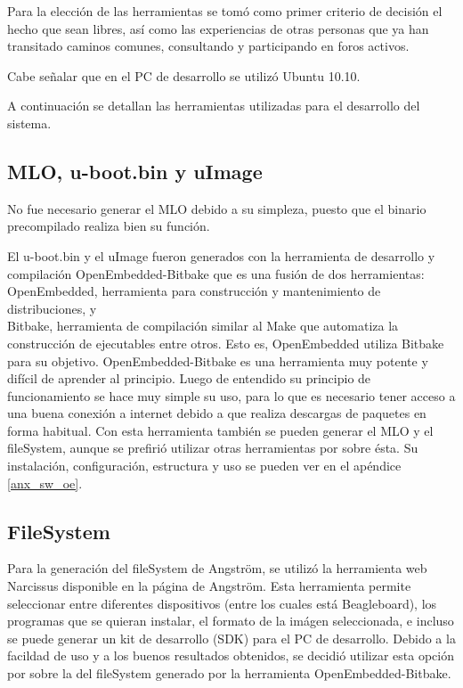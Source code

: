Para la elección de las herramientas se tomó como primer criterio de decisión el hecho que sean libres, así como las experiencias de otras personas que ya han transitado caminos comunes, consultando y participando en foros activos.

\bigskip
Cabe señalar que en el PC de desarrollo se utilizó Ubuntu 10.10.

\bigskip
A continuación se detallan las herramientas utilizadas para el desarrollo del sistema. 

\subsection{MLO, u-boot.bin y uImage}
No fue necesario generar el MLO debido a su simpleza, puesto que el binario precompilado realiza bien su función.

El u-boot.bin y el uImage fueron generados con la herramienta de desarrollo y compilación OpenEmbedded-Bitbake \cite{OE-Bb} que es una fusión de dos herramientas: OpenEmbedded, herramienta para construcción y mantenimiento de distribuciones, y \\
Bitbake, herramienta de compilación similar al Make \cite{Make} que automatiza la construcción de ejecutables entre otros. Esto es, OpenEmbedded utiliza Bitbake para su objetivo. OpenEmbedded-Bitbake es una herramienta muy potente y difícil de aprender al principio. Luego de entendido su principio de funcionamiento se hace muy simple su uso, para lo que es necesario tener acceso a una buena conexión a internet debido a que realiza descargas de paquetes en forma habitual.
Con esta herramienta también se pueden generar el MLO y el fileSystem, aunque se prefirió utilizar otras herramientas por sobre ésta. 
Su instalación, configuración, estructura y uso se pueden ver en el apéndice \ref{anx_sw_oe}.

\subsection{FileSystem}
Para la generación del fileSystem de Angström, se utilizó la herramienta web \\
Narcissus \cite{Narc} disponible en la página de Angström.
Esta herramienta permite seleccionar entre diferentes dispositivos (entre los cuales está Beagleboard), los programas que se quieran instalar, el formato de la imágen seleccionada, e incluso se puede generar un kit de desarrollo (SDK) para el PC de desarrollo. Debido a la facildad de uso y a los buenos resultados obtenidos, se decidió utilizar esta opción por sobre la del fileSystem generado por la herramienta OpenEmbedded-Bitbake.

